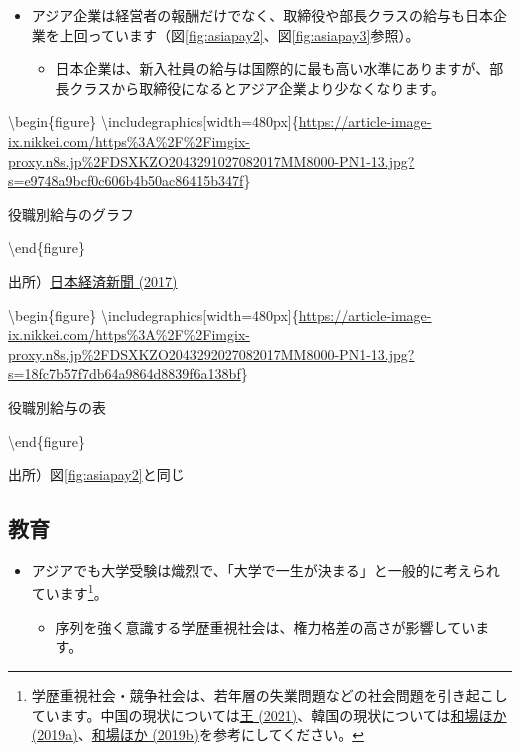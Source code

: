 \documentclass[
]{book}
\providecommand{\tightlist}{%
  \setlength{\itemsep}{0pt}\setlength{\parskip}{0pt}}
\begin{document}
\begin{itemize}
\item
  アジア企業は経営者の報酬だけでなく、取締役や部長クラスの給与も日本企業を上回っています（図\ref{fig:asiapay2}、図\ref{fig:asiapay3}参照）。

  \begin{itemize}
  \tightlist
  \item
    日本企業は、新入社員の給与は国際的に最も高い水準にありますが、部長クラスから取締役になるとアジア企業より少なくなります。
  \end{itemize}
\end{itemize}

\textbackslash begin\{figure\}
\textbackslash includegraphics{[}width=480px{]}\{\url{https://article-image-ix.nikkei.com/https\%3A\%2F\%2Fimgix-proxy.n8s.jp\%2FDSXKZO2043291027082017MM8000-PN1-13.jpg?s=e9748a9bcf0c606b4b50ac86415b347f}\}

\caption{役職別給与のグラフ}

\label{fig:asiapay2}
\textbackslash end\{figure\}

出所）\href{https://www.nikkei.com/article/DGXKASDZ04H4N_V10C17A8MM8000/}{日本経済新聞 (2017)}

\textbackslash begin\{figure\}
\textbackslash includegraphics{[}width=480px{]}\{\url{https://article-image-ix.nikkei.com/https\%3A\%2F\%2Fimgix-proxy.n8s.jp\%2FDSXKZO2043292027082017MM8000-PN1-13.jpg?s=18fc7b57f7db64a9864d8839f6a138bf}\}

\caption{役職別給与の表}

\label{fig:asiapay3}
\textbackslash end\{figure\}

出所）図\ref{fig:asiapay2}と同じ

\hypertarget{asia-education}{%
\subsection{教育}\label{asia-education}}

\begin{itemize}
\item
  アジアでも大学受験は熾烈で、「大学で一生が決まる」と一般的に考えられています\footnote{学歴重視社会・競争社会は、若年層の失業問題などの社会問題を引き起こしています。中国の現状については\href{https://diamond.jp/articles/-/277433}{王 (2021)}、韓国の現状については\href{https://hbol.jp/pc/189601/}{和場ほか (2019a)}、\href{https://hbol.jp/pc/189810/}{和場ほか (2019b)}を参考にしてください。}。

  \begin{itemize}
  \tightlist
  \item
    序列を強く意識する学歴重視社会は、権力格差の高さが影響しています。
  \end{itemize}
\end{itemize}
\end{document}
